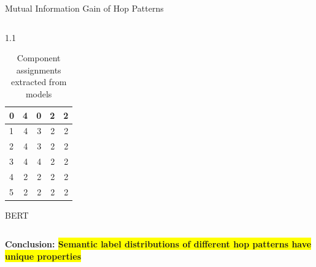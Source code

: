 \begin{alertblock}{Mutual Information Gain of Hop Patterns}
{\begin{column}{1.1\colwidth}
\begin{table}[]
\begin{subtable}{0.3\textwidth}
\begin{tabular}{|l|r|r|r|r|}
0 & \cellcolor{purple}4 & \cellcolor{white}0 & \cellcolor{gray}2 & \cellcolor{gray}2 \\ \hline
1 & \cellcolor{purple}4 & \cellcolor{violet}3 & \cellcolor{gray}2 & \cellcolor{gray}2 \\ \hline
2 & \cellcolor{purple}4 & \cellcolor{violet}3 & \cellcolor{gray}2 & \cellcolor{gray}2 \\ \hline
3 & \cellcolor{purple}4 & \cellcolor{purple}4 & \cellcolor{gray}2 & \cellcolor{gray}2 \\ \hline
4 & \cellcolor{gray}2 & \cellcolor{gray}2 & \cellcolor{gray}2 & \cellcolor{gray}2 \\ \hline
5 & \cellcolor{gray}2 & \cellcolor{gray}2 & \cellcolor{gray}2 & \cellcolor{gray}2 \\ \hline
\end{tabular}
\caption{BERT}
\end{subtable}
\vspace{-0.5cm}
\caption{Component assignments extracted from models}
\label{tbl:cluster-assignment}
\end{table}
\end{column}
}

\textbf{Conclusion: \colorbox{yellow}{Semantic label distributions of different hop patterns have unique properties}}

\end{alertblock}